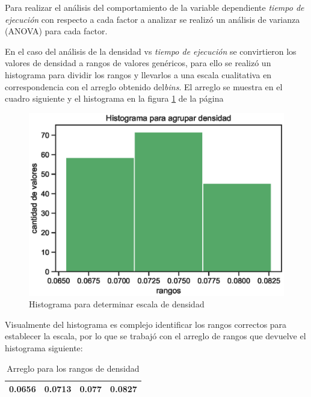 \documentclass{article}
\begin{document}
Para realizar el análisis del comportamiento de la variable dependiente \textit{tiempo de ejecución} con respecto a cada factor a analizar se realizó un análisis de varianza (ANOVA) para cada factor.

En el caso del análisis de la densidad vs \textit{tiempo de ejecución} se convirtieron los valores de densidad  a rangos de valores genéricos, para ello se realizó un histograma para dividir los rangos y llevarlos a una escala cualitativa en correspondencia con el arreglo obtenido del\textit{bins}. El arreglo se muestra en el cuadro siguiente y el histograma en la figura \ref{fig:Fig1} de la página \pageref{fig:Fig1}

\begin{figure}[h]
    \centering
    \includegraphics[scale=0.6]{Imagenes/Histogramadensidad.eps}
    \caption{Histograma para determinar escala de densidad}
    \label{fig:Fig1}
\end{figure}

Visualmente del histograma es complejo identificar los rangos correctos para establecer la escala, por lo que se trabajó con el arreglo de rangos que devuelve el histograma siguiente:

\begin{table}[htbp]
  \centering
  \caption{Arreglo para los rangos de densidad}
    \begin{tabular}{cccc}
    \toprule
    0.0656 & 0.0713 & 0.077 & 0.0827 \\
    \bottomrule
    \end{tabular}%
  \label{tab:addlabel}%
\end{table}%
\end{document}
